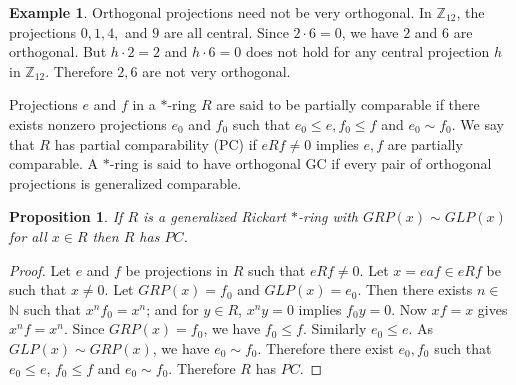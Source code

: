 \documentclass[11pt, one side,emlines]{amsart}
\newtheorem{proposition}[lemma]{Proposition}
\theoremstyle{definition}
\newtheorem{example}[lemma]{Example}
\numberwithin{equation}{section} \thispagestyle{empty} \voffset
\begin{document}
     \begin{example} Orthogonal projections need not be very orthogonal. 
     	 In $\mathbb{Z}_{12}$, the projections $0,1,4,$ and $9$ are all central.
     Since $2\cdot6 = 0$, we have $2$ and $6$ are orthogonal.
     	But $h\cdot2 = 2$ and $h\cdot6 = 0$ does not hold for any central projection $h$ in $\mathbb{Z}_{12}$.
     	Therefore $2, 6$ are not very orthogonal.	                 
    \end{example}
     Projections $e$ and $f$ in a $*$-ring $R$ are said to be partially comparable if there exists nonzero projections $e_0$ and $f_0$ such that $e_0\leq e , f_0\leq f$ and $e_0\sim f_0$.
    	We say that $R$ has partial comparability (PC) if $eRf\neq 0$ implies $e,f$ are partially comparable.    
      A $*$-ring is said to have orthogonal GC if every pair of orthogonal projections is generalized comparable. 
   
     \begin{proposition} If $R$ is a generalized Rickart $ *$-ring  with $GRP(x) \sim GLP(x)$ for all $ x \in R$ then $R$ has $PC$.
     \end{proposition}
     \begin{proof} Let $e$ and $f$ be projections in $R$ such that $eRf \neq 0$.
     	Let $x = eaf \in eRf$ be such that $x \neq 0$.
     	Let $GRP(x)= f_{0}$ and $GLP(x)= e_{0}$.
     	Then there exists $ n \in$ $\mathbb N$ such that
     	 $x^{n}f_{0}=x^{n}$; and for $y \in R$,  $x^{n}y=0 $ implies $f_{0}y=0$.
     	Now $xf =x $ gives $x^{n}f=x^{n}$. Since $GRP(x)=f_{0}$, we have $f_{0} \le  f$.
     	Similarly $e_{0}\le e$.
     	As $GLP(x) \sim GRP(x)$, we have  $e_{0} \sim f_{0}$.
     	Therefore there exist $e_{0},f_{0}$ such that $e_{0} \le e$, $f_{0} \le f$ and $e_{0} \sim f_{0}$.
     	Therefore $R$ has $PC$.
     \end{proof}
     
\end{document}
